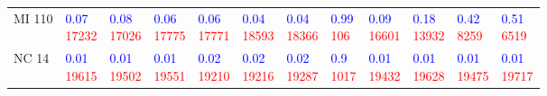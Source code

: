 \begin{tabular}{llllllllllll}
MI 110 &  \makecell{\textcolor{blue}{0.07} \\ \textcolor{red}{17232}} &  \makecell{\textcolor{blue}{0.08} \\ \textcolor{red}{17026}} &  \makecell{\textcolor{blue}{0.06} \\ \textcolor{red}{17775}} &  \makecell{\textcolor{blue}{0.06} \\ \textcolor{red}{17771}} &  \makecell{\textcolor{blue}{0.04} \\ \textcolor{red}{18593}} &  \makecell{\textcolor{blue}{0.04} \\ \textcolor{red}{18366}} &   \makecell{\textcolor{blue}{0.99} \\ \textcolor{red}{106}} &  \makecell{\textcolor{blue}{0.09} \\ \textcolor{red}{16601}} &  \makecell{\textcolor{blue}{0.18} \\ \textcolor{red}{13932}} &   \makecell{\textcolor{blue}{0.42} \\ \textcolor{red}{8259}} &   \makecell{\textcolor{blue}{0.51} \\ \textcolor{red}{6519}} \\
NC 14  &  \makecell{\textcolor{blue}{0.01} \\ \textcolor{red}{19615}} &  \makecell{\textcolor{blue}{0.01} \\ \textcolor{red}{19502}} &  \makecell{\textcolor{blue}{0.01} \\ \textcolor{red}{19551}} &  \makecell{\textcolor{blue}{0.02} \\ \textcolor{red}{19210}} &  \makecell{\textcolor{blue}{0.02} \\ \textcolor{red}{19216}} &  \makecell{\textcolor{blue}{0.02} \\ \textcolor{red}{19287}} &   \makecell{\textcolor{blue}{0.9} \\ \textcolor{red}{1017}} &  \makecell{\textcolor{blue}{0.01} \\ \textcolor{red}{19432}} &  \makecell{\textcolor{blue}{0.01} \\ \textcolor{red}{19628}} &  \makecell{\textcolor{blue}{0.01} \\ \textcolor{red}{19475}} &  \makecell{\textcolor{blue}{0.01} \\ \textcolor{red}{19717}} \\

\end{tabular}
